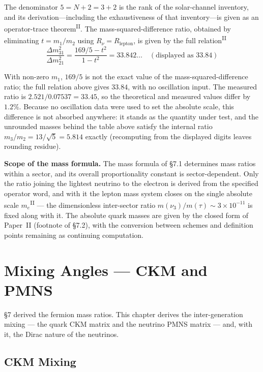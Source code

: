 \documentclass[12pt,a4paper]{article}
\newcommand{\PII}{\textsuperscript{\textup{II}}}
\begin{document}
The denominator $5 = N + 2 = 3 + 2$ is the rank of the solar-channel inventory, and its derivation---including the exhaustiveness of that inventory---is given as an operator-trace theorem\PII{}. The mass-squared-difference ratio, obtained by eliminating $t = m_1/m_2$ using $R_\nu = R_\mathrm{lepton}$, is given by the full relation\PII{}
\[\frac{\Delta m^2_{31}}{\Delta m^2_{21}} = \frac{169/5 - t^2}{1 - t^2} = 33.842\ldots\quad(\text{displayed as } 33.84)\]

With non-zero $m_1$, $169/5$ is not the exact value of the mass-squared-difference ratio; the full relation above gives $33.84$, with no oscillation input. The measured ratio is $2.521/0.07537 = 33.45$, so the theoretical and measured values differ by $1.2\%$. Because no oscillation data were used to set the absolute scale, this difference is not absorbed anywhere: it stands as the quantity under test, and the unrounded masses behind the table above satisfy the internal ratio $m_3/m_2 = 13/\sqrt5 = 5.814$ exactly (recomputing from the displayed digits leaves rounding residue).



\noindent\textbf{Scope of the mass formula.} The mass formula of \S7.1
determines mass ratios within a sector, and its overall proportionality
constant is sector-dependent. Only the ratio joining the lightest
neutrino to the electron is derived from the specified operator word,
and with it the lepton mass system closes on the single absolute
scale $m_e$\PII{} --- the dimensionless inter-sector ratio
$m(\nu_3)/m(\tau) \sim 3\times10^{-11}$ is fixed along with it. The absolute quark masses are given by the closed form of
Paper~II (footnote of \S7.2), with the conversion between schemes and definition points remaining as continuing computation.

\bigskip
\noindent

\section{Mixing Angles --- CKM and PMNS}\label{sec:mixing}

\S7 derived the fermion mass ratios. This chapter derives the inter-generation mixing --- the quark CKM matrix and the neutrino PMNS matrix --- and, with it, the Dirac nature of the neutrinos.

\subsection{CKM Mixing}\label{sec:ckm}
\end{document}
